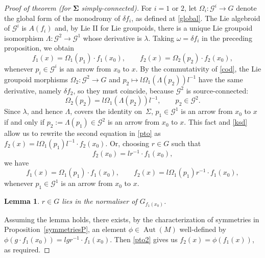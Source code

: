 \documentclass[pdftex]{sigma}%
\numberwithin{equation}{section}
\newtheorem{Lemma}[Theorem]{Lemma}
\DeclareMathOperator{\automorphism}{Aut}
\begin{document}
\begin{proof}[Proof of theorem (for $\boldsymbol{\Sigma}$ simply-connected)]
For $i=1$ or $2$, let $\Omega_i \colon {\mathcal G}^i \rightarrow G$
denote the global form of the monodromy of $\delta f_i$, as defined at
\eqref{global}. The Lie algebroid of ${\mathcal G}^i$ is $A(f_i)$ and,
by Lie II for Lie groupoids, there is a unique Lie groupoid
isomorphism $\Lambda \colon {\mathcal G}^2\rightarrow {\mathcal G}^1$
whose derivative is $\lambda$. Taking $\omega = \delta f_i$ in the
preceding proposition, we obtain
\begin{equation} f_1(x) = \Omega_1(p_1) \cdot f_1(x_0),\qquad f_2(x) =
\Omega_2(p_2) \cdot f_2(x_0), \label{pto}
\end{equation} whenever $p_i \in {\mathcal G}^i$ is an arrow from
$x_0$ to $x$. By the commutativity of \eqref{cod}, the Lie groupoid
morphisms $\Omega_2 \colon {\mathcal G}^2 \rightarrow G$ and $p_2
\mapsto l \Omega_1({\Lambda}(p_2))l^{-1}$ have the same
derivative, namely $\delta f_2$, so they must coincide, because
${\mathcal G}^2$ is source-connected:
\begin{equation}
\Omega_2(p_2) = l\Omega_1({\Lambda}(p_2))l^{-1},\qquad
p_2 \in {\mathcal G}^2.\label{ksd}
\end{equation}
Since $\lambda$, and hence $\Lambda$, covers the
identity on~$\Sigma $, $p_1 \in {\mathcal G}^1$ is an arrow from $x_0$
to $x$ if and only if $p_2:=\Lambda(p_1)\in {\mathcal G}^2$ is an
arrow from $x_0$ to $x$. This fact and \eqref{ksd} allow us to rewrite
the second equation in \eqref{pto} as $f_2(x)=l \Omega_1(p_1)l^{-1}
\cdot f_2(x_0)$. Or, choosing $r \in G$ such that
\begin{equation} f_2(x_0)=lr^{-1}\cdot f_1(x_0),\label{five}
\end{equation} we have
\begin{equation} f_1(x) = \Omega_1(p_1) \cdot f_1(x_0),\qquad f_2(x) =
l\Omega_1(p_1)r^{-1} \cdot f_1(x_0), \label{pto2}
\end{equation} whenever $p_1 \in {\mathcal G}^1$ is an arrow from
$x_0$ to $x$.
\begin{Lemma} $r \in G$ lies in the normaliser of $G_{f_1(x_0)}$.
\end{Lemma}

Assuming the lemma holds, there exists, by the
characterization of symmetries in Proposition~\ref{symmetriesP}, an
element $\phi \in \automorphism(M)$ well-defined by $\phi(g \cdot
f_1(x_0))=lgr^{-1}\cdot f_1(x_0)$. Then \eqref{pto2} gives us
$f_2(x)=\phi(f_1(x))$, as required.
\end{proof}
%
\end{document}
